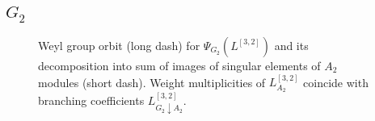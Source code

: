\documentclass[pdftex]{beamer}
\theoremstyle{definition} \newtheorem{Def}{Definition}
\begin{document}
\subsection{$G_2$}
\begin{frame}
  
  \begin{figure}[h!bt]
  \noindent{}

  \caption{Weyl group orbit  (long dash) for  $\Psi_{G_{2}}(L^{[3,2]})$ and its decomposition into sum of images of singular elements of   $A_{2}$ modules (short dash). Weight multiplicities of  $L^{[3,2]}_{A_{2}}$ coincide with branching coefficients $L^{[3,2]}_{G_{2}\downarrow A_{2}}$.}


 \label{fig:g2_splint}
\end{figure}

\end{frame}
\end{document}

